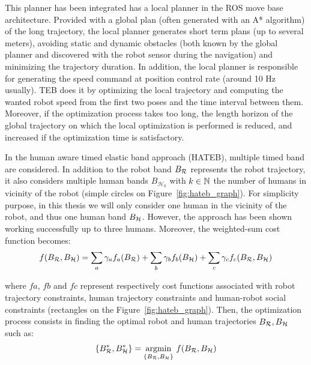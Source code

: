 \documentclass[a4paper,11pt,twoside]{StyleThese}
\begin{document}
This planner has been integrated has a local planner in the ROS move base architecture. Provided with a global plan (often generated with an A* algorithm) of the long trajectory, the local planner generates short term plans (up to several meters), avoiding static and dynamic obstacles (both known by the global planner and discovered with the robot sensor during the navigation) and minimizing the trajectory duration. In addition, the local planner is responsible for generating the speed command at position control rate (around 10 Hz usually). TEB does it by optimizing the local trajectory and computing the wanted robot speed from the first two poses and the time interval between them. Moreover, if the optimization process takes too long, the length horizon of the global trajectory on which the local optimization is performed is reduced, and increased if the optimization time is satisfactory.

In the human aware timed elastic band approach (HATEB), multiple timed band are considered. In addition to the robot band $B_\mathcal{R}$ represents the robot trajectory, it also considers multiple human bands $B_{\mathcal{H}_k}$ with $k \in \mathbb{N}$ the number of humans in vicinity of the robot (simple circles on Figure~\ref{fig:hateb_graph}). For simplicity purpose, in this thesis we will only consider one human in the vicinity of the robot, and thus one human band $B_\mathcal{H}$. However, the approach has been shown working successfully up to three humans.
Moreover, the weighted-sum cost function becomes:
\begin{equation} \label{eq:hateb_obj_function}
f(B_\mathcal{R}, B_\mathcal{H}) = \sum_a \gamma_a f_a(B_\mathcal{R}) + \sum_b \gamma_b f_b(B_\mathcal{H}) + \sum_c \gamma_c f_c(B_\mathcal{R}, B_\mathcal{H})
\end{equation}   

where $fa$, $fb$ and $fc$ represent respectively cost functions associated with robot trajectory constraints, human trajectory constraints and human-robot social constraints (rectangles on the Figure~\ref{fig:hateb_graph}). Then, the optimization process consists in finding the optimal robot and human trajectories $B_\mathcal{R}, B_\mathcal{H}$ such as:
\[\{B_\mathcal{R}^*, B_\mathcal{H}^*\} = \mathop{\mathrm{argmin}}_{\{B_\mathcal{R}, B_\mathcal{H}\}}\,f(B_\mathcal{R}, B_\mathcal{H})\]
\end{document}
